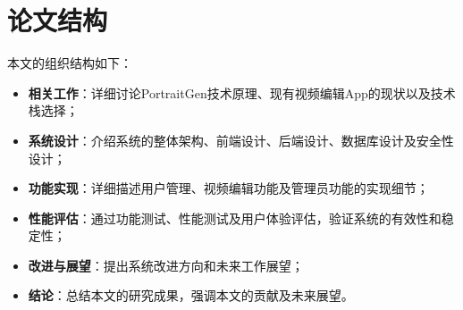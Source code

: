 \section{论文结构}

本文的组织结构如下：
\begin{itemize}
    \item \textbf{相关工作}：详细讨论PortraitGen技术原理、现有视频编辑App的现状以及技术栈选择；
    \item \textbf{系统设计}：介绍系统的整体架构、前端设计、后端设计、数据库设计及安全性设计；
    \item \textbf{功能实现}：详细描述用户管理、视频编辑功能及管理员功能的实现细节；
    \item \textbf{性能评估}：通过功能测试、性能测试及用户体验评估，验证系统的有效性和稳定性；
    \item \textbf{改进与展望}：提出系统改进方向和未来工作展望；
    \item \textbf{结论}：总结本文的研究成果，强调本文的贡献及未来展望。
\end{itemize}

